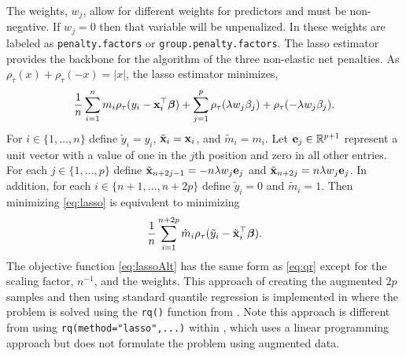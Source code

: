The weights, \(w_j\), allow for different weights for predictors and must be non-negative. If \(w_j=0\) then that variable will be unpenalized. In  these weights are labeled as \texttt{penalty.factors} or \texttt{group.penalty.factors}. The lasso estimator provides the backbone for the algorithm of the three non-elastic net penalties. As \(\rho_\tau(x)+\rho_\tau(-x) = |x|\), the lasso estimator minimizes,
\begin{equation}
\frac{1}{n} \sum_{i=1}^n m_i \rho_\tau(y_i - {\bf x}_i^\top\boldsymbol \beta) +  \sum_{j=1}^p \rho_\tau(\lambda w_j\beta_j)+\rho_\tau(-\lambda w_j\beta_j).
\label{eq:lasso}
\end{equation}
For \(i \in \{1,\ldots,n\}\) define \(\tilde{y}_i = y_i\), \(\tilde{{\bf x}}_i = {\bf x}_i\), and \(\tilde{m}_i = m_i\). Let \({\bf e}_j \in \mathbb{R}^{p+1}\) represent a unit vector with a value of one in the \(j\)th position and zero in all other entries. For each \(j \in \{1,\ldots,p\}\) define \(\tilde{{\bf x}}_{n+2j-1} = -n\lambda w_j {\bf e}_j\) and \(\tilde{{\bf x}}_{n+2j} = n\lambda w_j {\bf e}_j\). In addition, for each \(i \in \{n+1,\ldots,n+2p\}\) define \(\tilde{y}_i = 0\) and \(\tilde{m}_i=1\). Then minimizing \eqref{eq:lasso} is equivalent to minimizing
\begin{equation}
\frac{1}{n} \sum_{i=1}^{n+2p} \tilde{m}_i \rho_\tau(\tilde{y}_i-\tilde{{\bf x}}_i^\top\boldsymbol \beta).
\label{eq:lassoAlt}
\end{equation}
The objective function \eqref{eq:lassoAlt} has the same form as \eqref{eq:qr} except for the scaling factor, \(n^{-1}\), and the weights. This approach of creating the augmented \(2p\) samples and then using standard quantile regression is implemented in  where the problem is solved using the \texttt{rq()} function from . Note this approach is different from using \texttt{rq(method="lasso",...)} within , which uses a linear programming approach but does not formulate the problem using augmented data.

